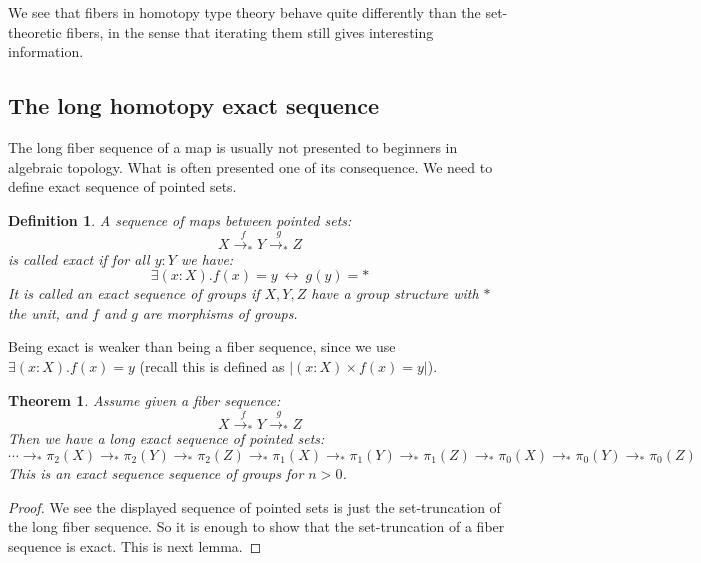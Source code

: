 \documentclass{article}
\newcommand{\sse}[1]{\medbreak \subsection{#1}}
\renewcommand{\r}{\rightarrow}
\newtheorem{definition}{Definition}
\newtheorem{theorem}{Theorem}
\begin{document}
We see that fibers in homotopy type theory behave quite differently than the set-theoretic fibers, in the sense that iterating them still gives interesting information.






\sse{The long homotopy exact sequence}

The long fiber sequence of a map is usually not presented to beginners in algebraic topology. What is often presented one of its consequence. We need to define exact sequence of pointed sets.

\begin{definition}
A sequence of maps between pointed sets:
\[X \overset{f}{\r_*} Y\overset{g}{\r_*} Z\] 
is called exact if for all $y:Y$ we have:
\[\exists(x:X).f(x)=y \ \leftrightarrow\ g(y)=*\]
It is called an exact sequence of groups if $X,Y,Z$ have a group structure with $*$ the unit, and $f$ and $g$ are morphisms of groups.
\end{definition}

Being exact is weaker than being a fiber sequence, since we use $\exists(x:X).f(x)=y$ (recall this is defined as $|(x:X)\times f(x)=y|$).

\begin{theorem}
Assume given a fiber sequence:
\[X \overset{f}{\r_*} Y\overset{g}{\r_*} Z\] 
Then we have a long exact sequence of pointed sets:
\[\cdots\r_*\pi_2(X)\r_* \pi_2(Y)\r_*\pi_2(Z) \r_* \pi_1(X)\r_*\pi_1(Y)\r_*\pi_1(Z) \r_* \pi_0(X)\r_*\pi_0(Y)\r_*\pi_0(Z)\]
This is an exact sequence sequence of groups for $n>0$. 
\end{theorem}
\begin{proof}
We see the displayed sequence of pointed sets is just the set-truncation of the long fiber sequence. So it is enough to show that the set-truncation of a fiber sequence is exact. This is next lemma.
\end{proof}
\end{document}
